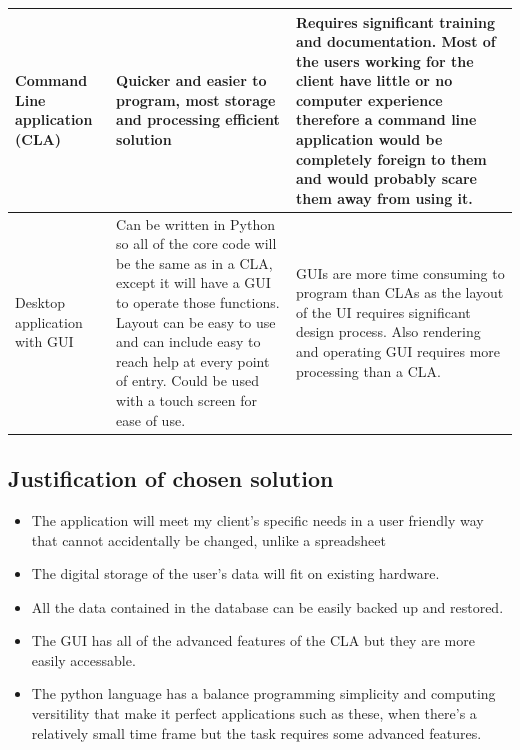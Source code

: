 \begin{table}[]
\begin{tabular}{|l|l|l|}
Command Line application (CLA) & Quicker and easier to program, most storage and processing efficient solution                                                                                                                                                                                                 & Requires significant training and documentation. Most of the users working for the client have little or no computer experience therefore a command line application would be completely foreign to them and would probably scare them away from using it. \\ \hline
Desktop application with GUI   & Can be written in Python so all of the core code will be the same as in a CLA, except it will have a GUI to
operate those functions. Layout can be easy to use and can include easy to reach help at every point of entry. Could be used with a touch screen for ease of use. & GUIs are more time consuming to program than CLAs as the layout of the UI requires significant design process. Also rendering and operating GUI requires more processing than a CLA.                                                                       \\ \hline
\end{tabular}
\end{table}

\subsection{Justification of chosen solution}

\begin{itemize}
	\item The application will meet my client's specific needs in a user friendly way that cannot accidentally be changed, unlike a spreadsheet
	\item The digital storage of the user's data will fit on existing hardware.
	\item All the data contained in the database can be easily backed up and restored.
	\item The GUI has all of the advanced features of the CLA but they are more easily accessable.
	\item The python language has a balance programming simplicity and computing versitility that make it perfect applications such as these, when there's a relatively small time frame but the task requires some advanced features.

\end{itemize}
